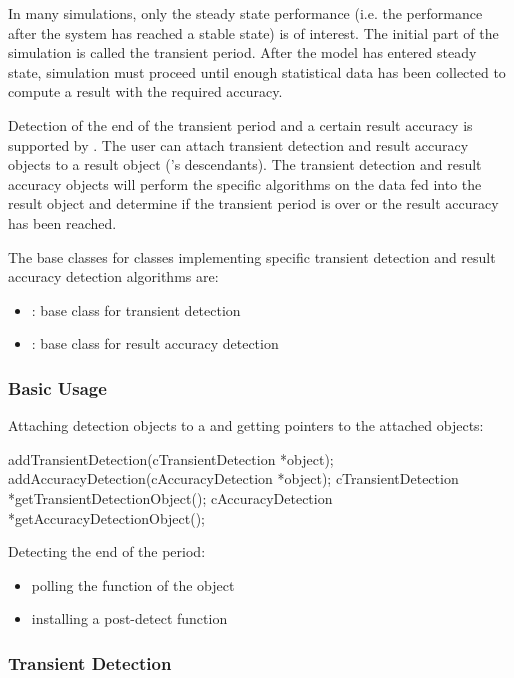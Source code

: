 In many simulations, only the steady state performance (i.e.
the performance after the system has reached a stable state)
is of interest. The initial part of the simulation is called
the transient period. After the model has entered steady state,
simulation must proceed until enough statistical data has been
collected to compute a result with the required accuracy.


Detection of the end of the transient period and a certain result
accuracy is supported by {\opp}. The user can attach transient
detection and result accuracy objects to a result object ('s
descendants). The transient detection and result accuracy objects will
perform the specific algorithms on the data fed into the result object and
determine if the transient period is over or the result accuracy has been
reached.

The base classes for classes implementing specific transient
detection and result accuracy detection algorithms are:
\begin{itemize}
\item{: base class for transient detection}
\item{: base class for result accuracy detection}
\end{itemize}


\subsubsection{Basic Usage}

%
%

Attaching detection objects to a  and getting pointers
to the attached objects:

\begin{cpp}
addTransientDetection(cTransientDetection *object);
addAccuracyDetection(cAccuracyDetection *object);
cTransientDetection *getTransientDetectionObject();
cAccuracyDetection *getAccuracyDetectionObject();
\end{cpp}


Detecting the end of the period:
\begin{itemize}
\item{polling the  function of the object}
\item{installing a post-detect function}
\end{itemize}


\subsubsection{Transient Detection}


